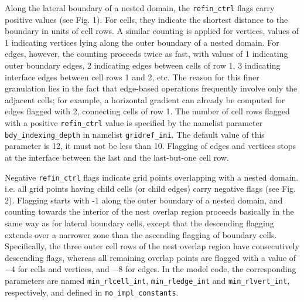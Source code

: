 \documentclass[11pt]{article}
\begin{document}
Along the lateral boundary of a nested domain, the \verb+refin_ctrl+ flags carry positive values (see Fig. 1). For cells, they
indicate the shortest distance to the boundary in units of cell rows. A similar counting is applied for vertices,
values of 1 indicating vertices lying along the outer boundary of a nested domain. For edges, however, the counting
proceeds twice as fast, with values of 1 indicating outer boundary edges, 2 indicating edges between cells of row 1, 
3 indicating interface edges between cell rows 1 and 2, etc. The reason for this finer granulation lies in the fact that
edge-based operations frequently involve only the adjacent cells; for example, a horizontal gradient can already be 
computed for edges flagged with 2, connecting cells of row 1. The number of cell rows flagged with a positive 
\verb+refin_ctrl+ value is specified by the namelist parameter \verb+bdy_indexing_depth+ in namelist \verb+gridref_ini+.
The default value of this parameter is 12, it must not be less than 10. Flagging of edges and vertices stops at
the interface between the last and the last-but-one cell row.

Negative \verb+refin_ctrl+ flags indicate grid points overlapping with a nested domain. i.e. all grid points
having child cells (or child edges) carry negative flags (see Fig. 2). Flagging starts with -1 along the outer
boundary of a nested domain, and counting towards the interior of the nest overlap region proceeds basically in the
same way as for lateral boundary cells, except that the descending flagging extends over a narrower zone
than the ascending flagging of boundary cells. Specifically, the three outer cell rows of the nest overlap
region have consecutively descending flags, whereas all remaining overlap points are flagged with a value of $-4$
for cells and vertices, and $-8$ for edges. In the model code, the corresponding parameters are named
\verb+min_rlcell_int+, \verb+min_rledge_int+ and \verb+min_rlvert_int+, respectively, and defined in 
\verb+mo_impl_constants+.
\end{document}
